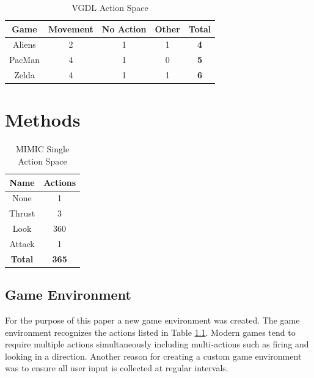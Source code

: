 \documentclass[12pt]{thesis}
\begin{document}
\begin{table}
  \caption{VGDL Action Space}
  \begin{center}
    \begin{tabular}{ | c | c | c | c | c | }
      \hline
      \bf Game & \bf Movement & \bf No Action & \bf Other & \bf Total \\ \hline
      Aliens & 2 & 1 & 1 & \bf 4 \\ \hline
      PacMan & 4 & 1 & 0 & \bf 5 \\ \hline
      Zelda & 4 & 1 & 1 & \bf 6 \\
      \hline
    \end{tabular}
  \end{center}
  \label{tab:vgdl_as}
\end{table}




\chapter{Methods}
\begin{table}
  \caption{MIMIC Single Action Space}
  \begin{center}
    \begin{tabular}{ | c | c | }
      \hline
      \bf Name & \bf Actions \\ \hline
      \hline
      None & 1 \\ \hline
      Thrust & 3 \\ \hline
      Look & 360 \\ \hline
      Attack & 1 \\ \hline
      \bf Total & \bf 365 \\
      \hline
    \end{tabular}
  \end{center}
  \label{tab:mimic_as}
\end{table}


\section{Game Environment}
For the purpose of this paper a new game environment was created. The game 
environment recognizes the actions listed in Table \ref{tab:mimic_as}. Modern 
games tend to require multiple actions simultaneously including multi-actions 
such as firing and looking in a direction. Another reason for creating a custom 
game environment was to ensure all user input is collected at regular intervals.
\end{document}
